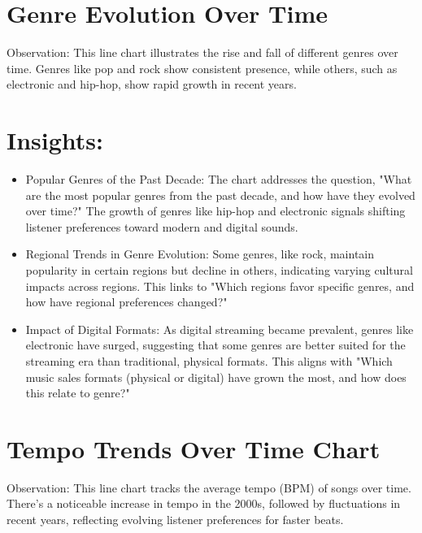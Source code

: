 \documentclass[12pt]{article}
\begin{document}
\section*{Genre Evolution Over Time}

Observation: This line chart illustrates the rise and fall of different genres over time. Genres like pop and rock show consistent presence, while others, such as electronic and hip-hop, show rapid growth in recent years.

\section*{Insights:}
\begin{itemize}
  \item Popular Genres of the Past Decade: The chart addresses the question, "What are the most popular genres from the past decade, and how have they evolved over time?" The growth of genres like hip-hop and electronic signals shifting listener preferences toward modern and digital sounds.
  \item Regional Trends in Genre Evolution: Some genres, like rock, maintain popularity in certain regions but decline in others, indicating varying cultural impacts across regions. This links to "Which regions favor specific genres, and how have regional preferences changed?"
  \item Impact of Digital Formats: As digital streaming became prevalent, genres like electronic have surged, suggesting that some genres are better suited for the streaming era than traditional, physical formats. This aligns with "Which music sales formats (physical or digital) have grown the most, and how does this relate to genre?"
\end{itemize}

\section*{Tempo Trends Over Time Chart}

Observation: This line chart tracks the average tempo (BPM) of songs over time. There's a noticeable increase in tempo in the 2000s, followed by fluctuations in recent years, reflecting evolving listener preferences for faster beats.
\end{document}
